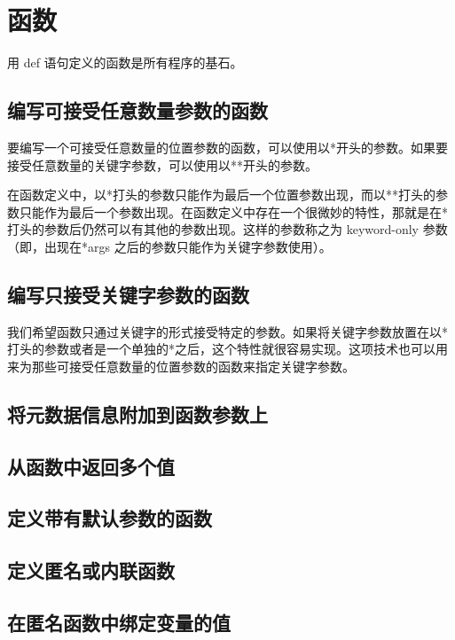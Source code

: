 \chapter{函数\label{ch07}}
用 def 语句定义的函数是所有程序的基石。
\section{编写可接受任意数量参数的函数}
要编写一个可接受任意数量的位置参数的函数，可以使用以*开头的参数。如果要接受任意数量的关键字参数，可以使用以**开头的参数。

在函数定义中，以*打头的参数只能作为最后一个位置参数出现，而以**打头的参数只能作为最后一个参数出现。在函数定义中存在一个很微妙的特性，那就是在*打头的参数后仍然可以有其他的参数出现。这样的参数称之为 keyword-only 参数（即，出现在*args 之后的参数只能作为关键字参数使用）。
\section{编写只接受关键字参数的函数}
我们希望函数只通过关键字的形式接受特定的参数。如果将关键字参数放置在以*打头的参数或者是一个单独的*之后，这个特性就很容易实现。这项技术也可以用来为那些可接受任意数量的位置参数的函数来指定关键字参数。
\section{将元数据信息附加到函数参数上}
\section{从函数中返回多个值}
\section{定义带有默认参数的函数}
\section{定义匿名或内联函数}
\section{在匿名函数中绑定变量的值}
\section{}
\section{}
\section{}
\section{}
\section{}
\section{}
\section{}